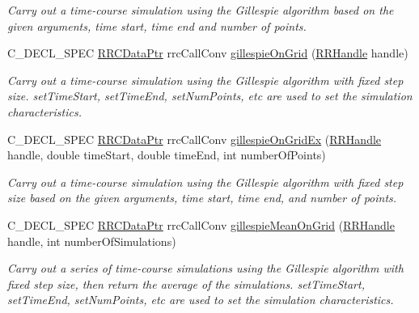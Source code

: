 \begin{DoxyCompactItemize}
\begin{DoxyCompactList}\small\item\em Carry out a time-\/course simulation using the Gillespie algorithm based on the given arguments, time start, time end and number of points. \end{DoxyCompactList}\item 
C\+\_\+\+D\+E\+C\+L\+\_\+\+S\+P\+E\+C \hyperlink{rrc__types_8h_a9da8b124eb9c3c0045f8926c6a420b4a}{R\+R\+C\+Data\+Ptr} rrc\+Call\+Conv \hyperlink{group__stochastic_ga2177740637e6d6732621c7cded0dbba5}{gillespie\+On\+Grid} (\hyperlink{rrc__types_8h_a1d68f0592372208fa5a5f2799ea4b3ae}{R\+R\+Handle} handle)
\begin{DoxyCompactList}\small\item\em Carry out a time-\/course simulation using the Gillespie algorithm with fixed step size. set\+Time\+Start, set\+Time\+End, set\+Num\+Points, etc are used to set the simulation characteristics. \end{DoxyCompactList}\item 
C\+\_\+\+D\+E\+C\+L\+\_\+\+S\+P\+E\+C \hyperlink{rrc__types_8h_a9da8b124eb9c3c0045f8926c6a420b4a}{R\+R\+C\+Data\+Ptr} rrc\+Call\+Conv \hyperlink{group__stochastic_gabedfc117be6781c6caca54ecc74561ea}{gillespie\+On\+Grid\+Ex} (\hyperlink{rrc__types_8h_a1d68f0592372208fa5a5f2799ea4b3ae}{R\+R\+Handle} handle, double time\+Start, double time\+End, int number\+Of\+Points)
\begin{DoxyCompactList}\small\item\em Carry out a time-\/course simulation using the Gillespie algorithm with fixed step size based on the given arguments, time start, time end, and number of points. \end{DoxyCompactList}\item 
C\+\_\+\+D\+E\+C\+L\+\_\+\+S\+P\+E\+C \hyperlink{rrc__types_8h_a9da8b124eb9c3c0045f8926c6a420b4a}{R\+R\+C\+Data\+Ptr} rrc\+Call\+Conv \hyperlink{group__stochastic_ga3f887a483162b0eed518be4faec411d6}{gillespie\+Mean\+On\+Grid} (\hyperlink{rrc__types_8h_a1d68f0592372208fa5a5f2799ea4b3ae}{R\+R\+Handle} handle, int number\+Of\+Simulations)
\begin{DoxyCompactList}\small\item\em Carry out a series of time-\/course simulations using the Gillespie algorithm with fixed step size, then return the average of the simulations. set\+Time\+Start, set\+Time\+End, set\+Num\+Points, etc are used to set the simulation characteristics. \end{DoxyCompactList}\item 

\end{DoxyCompactItemize}
